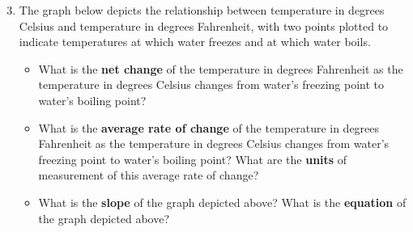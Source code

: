 \documentclass[10pt]{article}
\begin{document}
\begin{enumerate}\setcounter{enumi}{2}

\item The graph below depicts the relationship between temperature in degrees Celsius and temperature in degrees Fahrenheit, with two points plotted to indicate temperatures at which water freezes and at which water boils.

\begin{center}
\end{center}

    \begin{itemize}
    
    \item[(a)] What is the {\bf net change} of the temperature in degrees Fahrenheit as the temperature in degrees Celsius changes from water's freezing point to water's boiling point?
    
    \item[(b)] What is the {\bf average rate of change} of the temperature in degrees Fahrenheit as the temperature in degrees Celsius changes from water's freezing point to water's boiling point? What are the {\bf units} of measurement of this average rate of change?
    
    \item[(c)] What is the {\bf slope} of the graph depicted above? What is the {\bf equation} of the graph depicted above?
    

\end{itemize}
\end{enumerate}
\end{document}
